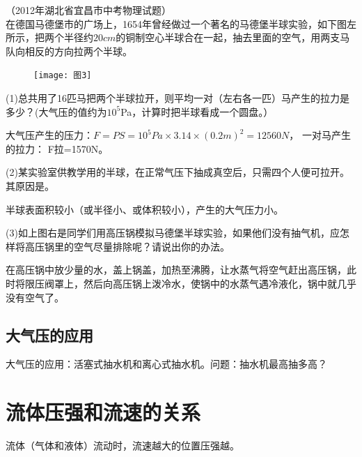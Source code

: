 \documentclass[12pt]{exam}%
\begin{document}
\begin{knowledge}
\begin{questions}
\setcounter{question}{4}
\question
（2012年湖北省宜昌市中考物理试题）\\
在德国马德堡市的广场上，1654年曾经做过一个著名的马德堡半球实验，如下图左所示，把两个半径约$20cm$的铜制空心半球合在一起，抽去里面的空气，用两支马队向相反的方向拉两个半球。 
\begin{figure}[H]
\centering
\texttt{[image: 图3]}
\end{figure}

(1)总共用了16匹马把两个半球拉开，则平均一对（左右各一匹）马产生的拉力是多少？(大气压的值约为$10^5$Pa，计算时把半球看成一个圆盘。） 
\begin{solutionorbox}[8ex]
大气压产生的压力：$F=PS=10^5Pa \times 3.14 \times (0.2m)^2=12560N$， 一对马产生的拉力： 
F拉=1570N。
\end{solutionorbox}

(2)某实验室供教学用的半球，在正常气压下抽成真空后，只需四个人便可拉开。其原因是\shortanswerline 。
\begin{solutionorbox}[6ex]
半球表面积较小（或半径小、或体积较小），产生的大气压力小。 
\end{solutionorbox}

(3)如上图右是同学们用高压锅模拟马德堡半球实验，如果他们没有抽气机，应怎样将高压锅里的空气尽量排除呢？请说出你的办法\shortanswerline 。
\begin{solutionorbox}[10ex]
在高压锅中放少量的水，盖上锅盖，加热至沸腾，让水蒸气将空气赶出高压锅，此时将限压阀罩上，然后向高压锅上泼冷水，使锅中的水蒸气遇冷液化，锅中就几乎没有空气了。
\end{solutionorbox}
\end{questions}

\subsection{大气压的应用}
大气压的应用：活塞式抽水机和离心式抽水机。问题：抽水机最高抽多高？

\section{流体压强和流速的关系}
流体（气体和液体）流动时，流速越大的位置压强越\answerline*[小]。


\end{knowledge}
\end{document}
